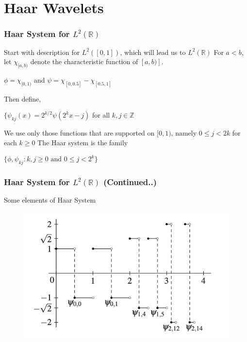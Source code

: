 \documentclass{beamer}
\begin{document}

\section{Haar Wavelets} %

\begin{frame}
\frametitle{Haar System for  $L^2\left({\mathbb{R}}\right)$ }
Start with description for $L^2([0,1])$, which will lead us to $L^2\left({\mathbb{R}}\right)$
\linebreak\linebreak
For $a < b$, let $\chi_{[a,b)}$ denote the characteristic function of $[a, b)]$.

\begin{center}
        $\phi=\chi_{[0,1)}$ and $\psi = \chi_{[0, 0.5]} - \chi_{[0.5, 1]}$
    \end{center} 
Then define,
\begin{center}
    $\{\psi_{kj}(x) = 2^{k/2}\psi(2^kx-j)$ \space\space\space for all \space\space\space $k,j \in \mathbb{Z}$
\end{center} 

We use only those functions that are supported on $[0, 1)$, namely $0 \le j < 2k$ for each
$k \ge 0$
\linebreak\linebreak
The Haar system is the family

\begin{block}{}
    \begin{center}
        $\{\phi, \psi_{kj}:k,j\ge 0 \text{ and } 0 \le j < 2^k\}$
    \end{center}
\end{block}

\end{frame}

\begin{frame}
\frametitle{ Haar System for  $L^2\left({\mathbb{R}}\right)$ (Continued..)}
Some elements of Haar System
\begin{figure}
\includegraphics[width=0.8\linewidth]{haarsystem.jpg}
\end{figure}
\end{frame}
\end{document}
